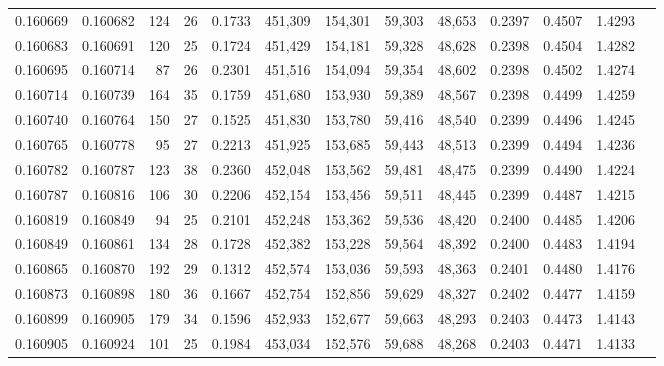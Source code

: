 \begin{tabular}{rrrrrrrrrrrrr}
0.160669 & 0.160682 &   124 &  26 &                                     0.1733 & 451,309 & 154,301 &  59,303 &  48,653 & 0.2397 & 0.4507 & 1.4293 \\
0.160683 & 0.160691 &   120 &  25 &                                     0.1724 & 451,429 & 154,181 &  59,328 &  48,628 & 0.2398 & 0.4504 & 1.4282 \\
0.160695 & 0.160714 &    87 &  26 &                                     0.2301 & 451,516 & 154,094 &  59,354 &  48,602 & 0.2398 & 0.4502 & 1.4274 \\
0.160714 & 0.160739 &   164 &  35 &                                     0.1759 & 451,680 & 153,930 &  59,389 &  48,567 & 0.2398 & 0.4499 & 1.4259 \\
0.160740 & 0.160764 &   150 &  27 &                                     0.1525 & 451,830 & 153,780 &  59,416 &  48,540 & 0.2399 & 0.4496 & 1.4245 \\
0.160765 & 0.160778 &    95 &  27 &                                     0.2213 & 451,925 & 153,685 &  59,443 &  48,513 & 0.2399 & 0.4494 & 1.4236 \\
0.160782 & 0.160787 &   123 &  38 &                                     0.2360 & 452,048 & 153,562 &  59,481 &  48,475 & 0.2399 & 0.4490 & 1.4224 \\
0.160787 & 0.160816 &   106 &  30 &                                     0.2206 & 452,154 & 153,456 &  59,511 &  48,445 & 0.2399 & 0.4487 & 1.4215 \\
0.160819 & 0.160849 &    94 &  25 &                                     0.2101 & 452,248 & 153,362 &  59,536 &  48,420 & 0.2400 & 0.4485 & 1.4206 \\
0.160849 & 0.160861 &   134 &  28 &                                     0.1728 & 452,382 & 153,228 &  59,564 &  48,392 & 0.2400 & 0.4483 & 1.4194 \\
0.160865 & 0.160870 &   192 &  29 &                                     0.1312 & 452,574 & 153,036 &  59,593 &  48,363 & 0.2401 & 0.4480 & 1.4176 \\
0.160873 & 0.160898 &   180 &  36 &                                     0.1667 & 452,754 & 152,856 &  59,629 &  48,327 & 0.2402 & 0.4477 & 1.4159 \\
0.160899 & 0.160905 &   179 &  34 &                                     0.1596 & 452,933 & 152,677 &  59,663 &  48,293 & 0.2403 & 0.4473 & 1.4143 \\
0.160905 & 0.160924 &   101 &  25 &                                     0.1984 & 453,034 & 152,576 &  59,688 &  48,268 & 0.2403 & 0.4471 & 1.4133 \\

\end{tabular}
